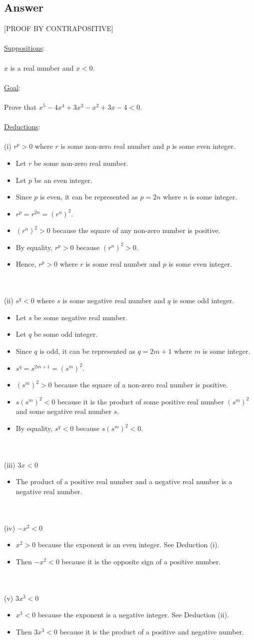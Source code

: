 \documentclass[12pt]{article}
\newcommand{\xlist}[1]{
    \begin{itemize}
        \renewcommand{\labelitemi}{$\centerdot$}
        #1
    \end{itemize}
    \newblock
    \\ \\
}
\newcommand{\xsupposition}[1]{
    \underline{Suppositions}:
    \\ \\
    #1
    \\ \\
}
\newcommand{\xgoal}[1]{
    \underline{Goal}:
    \\ \\
    #1
    \\ \\
}
\newcommand{\xdeductions}{
    \underline{Deductions}:
    \\ \\
}
\begin{document}
\subsection*{Answer}
[PROOF BY CONTRAPOSITIVE] \\ \\
\xsupposition{$x$ is a real number and $x < 0$.}
\xgoal{Prove that $x^5 - 4x^4 + 3x^3 - x^2 + 3x - 4 < 0$.}
\xdeductions
(i) $r^p > 0$ where $r$ is some non-zero real number and $p$ is some even integer.
\xlist{
  \item Let $r$ be some non-zero real number.
  \item Let $p$ be an even integer.
  \item Since $p$ is even, it can be represented as $p=2n$ where $n$ is some integer.
  \item $r^p = r^{2n} = (r^n)^2$.
  \item $(r^n)^2 > 0$ because the square of any non-zero number is positive.
  \item By equality, $r^p > 0$ because $(r^n)^2 > 0$.
  \item Hence, $r^p > 0$ where $r$ is some real number and $p$ is some even integer.
}
(ii) $s^q < 0$ where $s$ is some negative real number and $q$ is some odd integer.
\xlist{
    \item Let $s$ be some negative real number.
    \item Let $q$ be some odd integer.
    \item Since $q$ is odd, it can be represented as $q=2m + 1$ where $m$ is some integer.
    \item $s^q = s^{2m + 1} = (s^m)^2$.
    \item $(s^m)^2 > 0$ because the square of a non-zero real number is positive.
    \item $s(s^m)^2 < 0$ because it is the product of some positive real number $(s^m)^2$ and some negative real number $s$.
    \item By equality, $s^q < 0$ because $s(s^m)^2 < 0$.
}
(iii) $3x < 0$
\xlist{
  \item The product of a positive real number and a negative real number is a negative real number.
}
(iv) $-x^2 < 0$
\xlist{
  \item $x^2 > 0$ because the exponent is an even integer. See Deduction (i).
  \item Then $-x^2 < 0$ because it is the opposite sign of a positive number.
}
(v) $3x^3 < 0$
\xlist{
  \item $x^3 < 0$ because the exponent is a negative integer. See Deduction (ii).
  \item Then $3x^3 < 0$ because it is the product of a positive and negative number.
  
}
\end{document}
